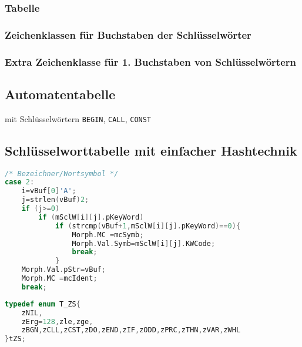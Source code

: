 \subsubsection{Tabelle}
\subsubsection{Zeichenklassen für Buchstaben der Schlüsselwörter}
\subsubsection{Extra Zeichenklasse für 1. Buchstaben von Schlüsselwörtern}
\subsection{Automatentabelle}
mit Schlüsselwörtern \lstinline`BEGIN`, \lstinline`CALL`, \lstinline`CONST`

\subsection{Schlüsselworttabelle mit einfacher Hashtechnik}

\begin{lstlisting}[language=C]
/* Bezeichner/Wortsymbol */
case 2:
	i=vBuf[0]'A';
	j=strlen(vBuf)2;
	if (j>=0)
		if (mSclW[i][j].pKeyWord)
			if (strcmp(vBuf+1,mSclW[i][j].pKeyWord)==0){
				Morph.MC =mcSymb;
				Morph.Val.Symb=mSclW[i][j].KWCode;
				break;
			}
	Morph.Val.pStr=vBuf;
	Morph.MC =mcIdent;
	break;
\end{lstlisting}
\begin{lstlisting}[language=C]	
typedef enum T_ZS{
	zNIL,
	zErg=128,zle,zge,
	zBGN,zCLL,zCST,zDO,zEND,zIF,zODD,zPRC,zTHN,zVAR,zWHL
}tZS;
\end{lstlisting}


